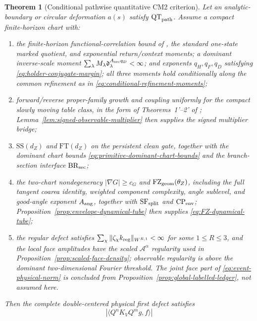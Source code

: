 \documentclass[11pt]{article}
\newtheorem{theorem}{Theorem}[section]
\begin{document}
\begin{theorem}[Conditional pathwise quantitative CM2 criterion]
\label{thm:global-cm2-assembly}
Let an analytic-boundary or circular deformation $a(s)$ satisfy
$\mathrm{QT}_{\rm path}$.
Assume a compact finite-horizon chart with:
\begin{enumerate}[label=\textup{(H\arabic*)}]
\item the finite-horizon functional-correlation bound of \cite{LS}, the
      standard one-state marked quotient, and exponential return/context
      moments; a dominant inverse-scale moment
      $\sum_\lambda M_\lambda
      \mathfrak d_\lambda^{A_{\rm sec}q_D}<\infty$; and
      exponents $q_H,q_F,q_D$ satisfying
      \eqref{eq:holder-conjugate-margin}; all three moments hold conditionally
      along the common refinement as in
      \eqref{eq:conditional-refinement-moments};
\item forward/reverse proper-family growth and coupling uniformly for the
      compact slowly moving table class, in the form of Theorems~1'--2' of
      \cite{SYZ}; Lemma~\ref{lem:signed-observable-multiplier} then supplies
      the signed multiplier bridge;
\item $\mathrm{SS}(d_Z)$ and
      $\mathrm{FT}(d_Z)$ on the persistent clean gate, together with the
      dominant chart bounds \eqref{eq:primitive-dominant-chart-bounds} and
      the branch-section interface $\mathrm{BR}_{\rm sec}$;
\item the two-chart nondegeneracy $|\nabla G|\ge c_G$ and
      $\mathrm{FZ}_{\rm geom}(\theta_Z)$, including the full tangent coarea identity,
      weighted component complexity, angle sublevel, and good-angle exponent
      $A_{\rm ang}$, together with $\mathrm{SF}_{\rm split}$ and
      $\mathrm{CP}_{\rm env}$; Proposition~\ref{prop:envelope-dynamical-tube}
      then supplies \eqref{eq:FZ-dynamical-tube};
\item the regular defect satisfies
      $\sum_\chi\|\zeta_\chi k_{\rm reg}\|_{W^{R,1}}<\infty$ for some
      $1\le R\le3$, and the local face amplitudes have the scaled
      $\mathcal A^\alpha$ regularity used in
      Proposition~\ref{prop:scaled-face-density}; observable regularity is
      above the dominant two-dimensional Fourier threshold.  The joint face
      part of \eqref{eq:event-physical-norm} is concluded from
      Proposition~\ref{prop:global-labelled-ledger}, not assumed here.
\end{enumerate}
Then the complete double-centered physical first defect satisfies
\[
 |\langle Q^nK_VQ^mg,f\rangle|
\]
\end{theorem}
\end{document}
